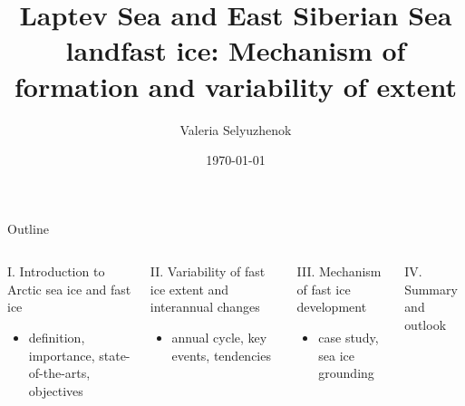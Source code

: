 \documentclass[8pt]{beamer}
\title{Laptev Sea and East Siberian Sea landfast ice: Mechanism of formation and variability of extent}
\date{\today}
\author{Valeria Selyuzhenok}
\institute{Jacobs University Bremen}
\begin{document}
\maketitle

	
\setwatermark{\fontsize{125pt}{125pt}\selectfont{}}
\begin{frame}{Outline}
	\begin{columns}
		\begin{block}{I. Introduction to Arctic sea ice and fast ice}
			\begin{itemize}
				\item definition, importance, state-of-the-arts, objectives
			\end{itemize}
		\end{block}
		\begin{block}{II. Variability of fast ice extent and interannual changes}
			\begin{itemize}
				\item annual cycle, key events, tendencies
			\end{itemize}
		\end{block}
		\begin{block}{III. Mechanism of fast ice development}
				\begin{itemize}
					\item case study, sea ice grounding
				\end{itemize}
		\end{block}
		\begin{block}{IV. Summary and outlook} 
		\end{block}
	\end{columns}
\end{frame}
\end{document}
